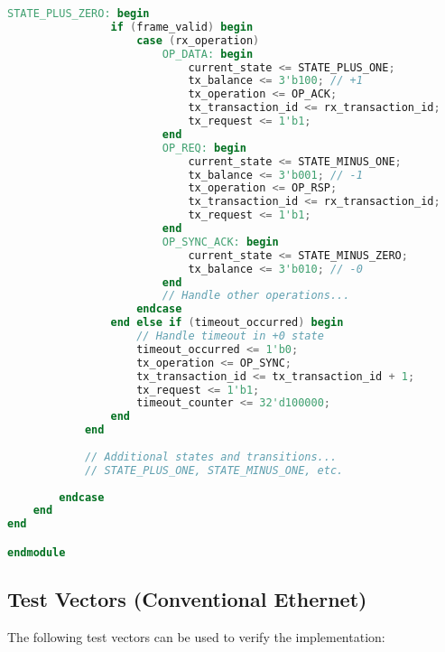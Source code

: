 \documentclass[../../../OAE-SPEC-MAIN.tex]{subfiles}
\begin{document}
\begin{lstlisting}[language=Verilog]
            STATE_PLUS_ZERO: begin
                if (frame_valid) begin
                    case (rx_operation)
                        OP_DATA: begin
                            current_state <= STATE_PLUS_ONE;
                            tx_balance <= 3'b100; // +1
                            tx_operation <= OP_ACK;
                            tx_transaction_id <= rx_transaction_id;
                            tx_request <= 1'b1;
                        end
                        OP_REQ: begin
                            current_state <= STATE_MINUS_ONE;
                            tx_balance <= 3'b001; // -1
                            tx_operation <= OP_RSP;
                            tx_transaction_id <= rx_transaction_id;
                            tx_request <= 1'b1;
                        end
                        OP_SYNC_ACK: begin
                            current_state <= STATE_MINUS_ZERO;
                            tx_balance <= 3'b010; // -0
                        end
                        // Handle other operations...
                    endcase
                end else if (timeout_occurred) begin
                    // Handle timeout in +0 state
                    timeout_occurred <= 1'b0;
                    tx_operation <= OP_SYNC;
                    tx_transaction_id <= tx_transaction_id + 1;
                    tx_request <= 1'b1;
                    timeout_counter <= 32'd100000;
                end
            end
            
            // Additional states and transitions...
            // STATE_PLUS_ONE, STATE_MINUS_ONE, etc.
            
        endcase
    end
end

endmodule
\end{lstlisting}

\subsection{Test Vectors (Conventional Ethernet)}

The following test vectors can be used to verify the implementation:
\end{document}
